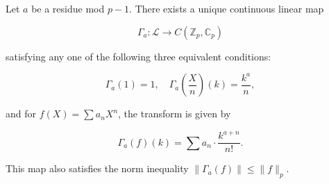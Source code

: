 Let $a$ be a residue mod $p-1$. There exists a unique continuous linear map

$$\Gamma_a: \mathcal{L} \to C(\mathbb{Z}_p, \mathbb{C}_p)$$

satisfying any one of the following three equivalent conditions:

$$\Gamma_a(1) = 1, \quad \Gamma_a\left(\frac{X}{n}\right)(k) = \frac{k^a}{n},$$

and for $f(X) = \sum a_n X^n$, the transform is given by

$$\Gamma_a(f)(k) = \sum a_n \cdot \frac{k^{a+n}}{n!}.$$

This map also satisfies the norm inequality $\|\Gamma_a(f)\| \le \|f\|_p$.
